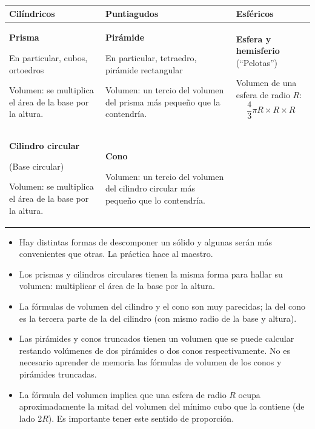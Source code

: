 \documentclass[12pt,a4paper]{article}
\begin{document}
\begin{tcolorbox}[colback=fondoazul, colframe=azuloscuro, title=\textbf{VOLUMEN}, breakable]
\begin{center}
\begin{tabular}{|
		>{\centering\arraybackslash}m{3.5cm}|
		>{\centering\arraybackslash}m{3.5cm}|
		>{\centering\arraybackslash}m{3.5cm}|}
\hline
\textbf{Cilíndricos} & \textbf{Puntiagudos} & \textbf{Esféricos} \\
\hline
\textbf{Prisma}

En particular, cubos, ortoedros

Volumen: se multiplica el área de la base por la altura. &
\textbf{Pirámide}

En particular, tetraedro, pirámide rectangular

Volumen: un tercio del volumen del prisma más pequeño que la contendría. &
\textbf{Esfera y hemisferio} (``Pelotas'')

Volumen de una esfera de radio $R$:
$$\frac{4}{3}\pi R \times R \times R$$ \\
\hline
\textbf{Cilindro circular}

(Base circular)

Volumen: se multiplica el área de la base por la altura. &
\textbf{Cono}

Volumen: un tercio del volumen del cilindro circular más pequeño que lo contendría. & \\
\hline
\end{tabular}
\end{center}
\end{tcolorbox}

\begin{tcolorbox}[colback=fondoverde, colframe=verdeclaro, title=\textbf{Ten en cuenta que:}, breakable]
\begin{itemize}[nosep]
    \item Hay distintas formas de descomponer un sólido y algunas serán más convenientes que otras. La práctica hace al maestro.
    \item Los prismas y cilindros circulares tienen la misma forma para hallar su volumen: multiplicar el área de la base por la altura.
    \item La fórmulas de volumen del cilindro y el cono son muy parecidas; la del cono es la tercera parte de la del cilindro (con mismo radio de la base y altura).
    \item Las pirámides y conos truncados tienen un volumen que se puede calcular restando volúmenes de dos pirámides o dos conos respectivamente. No es necesario aprender de memoria las fórmulas de volumen de los conos y pirámides truncadas.
    \item La fórmula del volumen implica que una esfera de radio $R$ ocupa aproximadamente la mitad del volumen del mínimo cubo que la contiene (de lado 2$R$). Es importante tener este sentido de proporción.
\end{itemize}
\end{tcolorbox}
\end{document}
